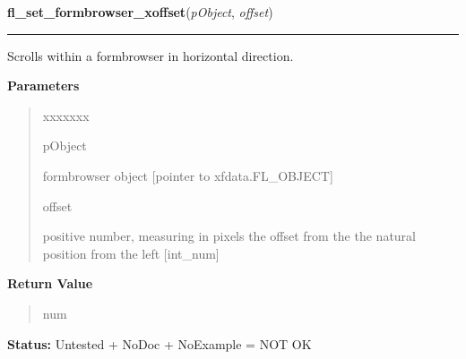 \hspace{.8\funcindent}\begin{boxedminipage}{\funcwidth}

    \raggedright \textbf{fl\_set\_formbrowser\_xoffset}(\textit{pObject}, \textit{offset})

    \vspace{-1.5ex}

    \rule{\textwidth}{0.5\fboxrule}
\setlength{\parskip}{2ex}
    Scrolls within a formbrowser in horizontal direction.

\setlength{\parskip}{1ex}
      \textbf{Parameters}
      \vspace{-1ex}

      \begin{quote}
        \begin{Ventry}{xxxxxxx}

          \item[pObject]

          formbrowser object [pointer to xfdata.FL\_OBJECT]

          \item[offset]

          positive number, measuring in pixels the offset from the the 
          natural position from the left [int\_num]

        \end{Ventry}

      \end{quote}

      \textbf{Return Value}
    \vspace{-1ex}

      \begin{quote}
      num

      \end{quote}

\textbf{Status:} Untested + NoDoc + NoExample = NOT OK



    \end{boxedminipage}

    \label{xformslib:library:fl_set_formbrowser_yoffset}

    \vspace{0.5ex}

